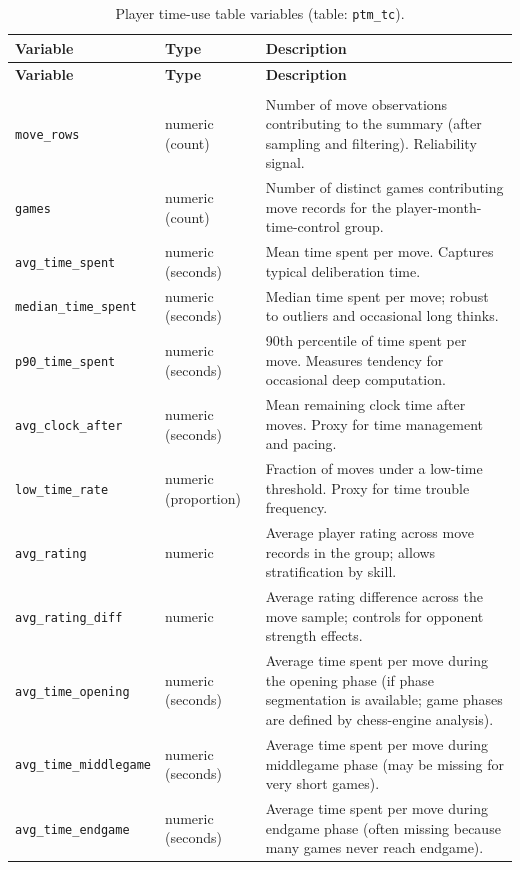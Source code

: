 \documentclass[
  12pt]{article}
\newcommand{\us}{\_\allowbreak}
\begin{document}
\begin{xltabular}{\textwidth}{>{\raggedright\arraybackslash}p{3.2cm} >{\raggedright\arraybackslash}p{2.6cm} X}
\caption{Player time-use table variables (table: \texttt{ptm\us tc}).}\label{tab:variables-player-time}\\
\toprule
\textbf{Variable} & \textbf{Type} & \textbf{Description} \\
\midrule
\endfirsthead

\toprule
\textbf{Variable} & \textbf{Type} & \textbf{Description} \\
\midrule
\endhead

\midrule
{} \\
\endfoot

\bottomrule
\endlastfoot

\texttt{move\us rows} & numeric (count) & Number of move observations contributing to the summary (after sampling and filtering). Reliability signal. \\
\texttt{games} & numeric (count) & Number of distinct games contributing move records for the player-month-time-control group. \\
\texttt{avg\us time\us spent} & numeric (seconds) & Mean time spent per move. Captures typical deliberation time. \\
\texttt{median\us time\us spent} & numeric (seconds) & Median time spent per move; robust to outliers and occasional long thinks. \\
\texttt{p90\us time\us spent} & numeric (seconds) & 90th percentile of time spent per move. Measures tendency for occasional deep computation. \\
\texttt{avg\us clock\us after} & numeric (seconds) & Mean remaining clock time after moves. Proxy for time management and pacing. \\
\texttt{low\us time\us rate} & numeric (proportion) & Fraction of moves under a low-time threshold. Proxy for time trouble frequency. \\
\texttt{avg\us rating} & numeric & Average player rating across move records in the group; allows stratification by skill. \\
\texttt{avg\us rating\us diff} & numeric & Average rating difference across the move sample; controls for opponent strength effects. \\
\texttt{avg\us time\us opening} & numeric (seconds) & Average time spent per move during the opening phase (if phase segmentation is available; game phases are defined by chess-engine analysis). \\
\texttt{avg\us time\us middlegame} & numeric (seconds) & Average time spent per move during middlegame phase (may be missing for very short games). \\
\texttt{avg\us time\us endgame} & numeric (seconds) & Average time spent per move during endgame phase (often missing because many games never reach endgame). \\
\end{xltabular}
\end{document}
